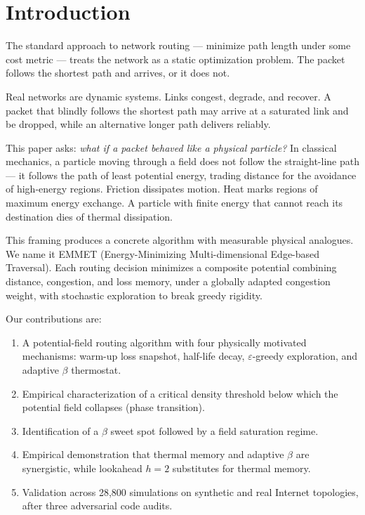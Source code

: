 \documentclass[11pt,a4paper]{article}
\begin{document}
\section{Introduction}

The standard approach to network routing --- minimize path length under
some cost metric --- treats the network as a static optimization
problem. The packet follows the shortest path and arrives, or it does
not.

Real networks are dynamic systems. Links congest, degrade, and recover.
A packet that blindly follows the shortest path may arrive at a
saturated link and be dropped, while an alternative longer path
delivers reliably.

This paper asks: \textit{what if a packet behaved like a physical
particle?} In classical mechanics, a particle moving through a field
does not follow the straight-line path --- it follows the path of
least potential energy, trading distance for the avoidance of
high-energy regions. Friction dissipates motion. Heat marks regions of
maximum energy exchange. A particle with finite energy that cannot
reach its destination dies of thermal dissipation.

This framing produces a concrete algorithm with measurable physical
analogues. We name it EMMET (Energy-Minimizing Multi-dimensional
Edge-based Traversal). Each routing decision minimizes a composite
potential combining distance, congestion, and loss memory, under a
globally adapted congestion weight, with stochastic exploration to
break greedy rigidity.

Our contributions are:
\begin{enumerate}[itemsep=2pt]
  \item A potential-field routing algorithm with four physically
        motivated mechanisms: warm-up loss snapshot, half-life decay,
        $\varepsilon$-greedy exploration, and adaptive $\beta$
        thermostat.
  \item Empirical characterization of a critical density threshold
        below which the potential field collapses (phase transition).
  \item Identification of a $\beta$ sweet spot followed by a field
        saturation regime.
  \item Empirical demonstration that thermal memory and adaptive
        $\beta$ are synergistic, while lookahead $h{=}2$ substitutes
        for thermal memory.
  \item Validation across 28{,}800 simulations on synthetic and real
        Internet topologies, after three adversarial code audits.
\end{enumerate}
\end{document}
